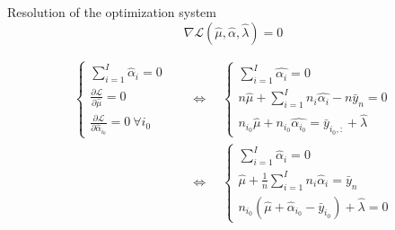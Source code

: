 \documentclass[unknownkeysallowed]{beamer}
\begin{document}
\begin{frame}{Resolution of the optimization system}
\[\nabla \mathcal{L}(\hat\mu,\hat\alpha,\hat\lambda)=0\]

\[
\begin{aligned}
\begin{cases}
\sum\limits_{i=1}^{I}\hat{\alpha}_i=0 \\
\frac{\partial \mathcal{L}}{\partial \hat\mu}=0\\
\frac{\partial \mathcal{L}}{\partial \hat\alpha_{i_0}}=0\ \forall i_0
\end{cases}
\quad&\Longleftrightarrow\quad
\begin{cases}
\sum\limits_{i=1}^{I}\hat{\alpha_i}=0 \\
n\hat{\mu}+ \sum\limits_{i=1}^I n_i\hat{\alpha_i}-n\bar{y}_n=0\\
n_{i_0} \hat{\mu} +n_{i_0} \hat{\alpha_{i_0}} = \bar{y}_{i_0,:} + \hat\lambda
\end{cases} \\
& \Longleftrightarrow\quad
\begin{cases}
\displaystyle\sum_{i=1}^{I}\hat{\alpha}_i=0  \\
\hat{\mu}+\frac{1}{n} \sum\limits_{i=1}^I n_i \hat{\alpha}_i=\bar{y}_n \\
n_{i_0}(\hat{\mu}+\hat{\alpha}_{i_0}-\bar{y}_{i_0}) +\hat{\lambda}=0 
\end{cases}
\end{aligned}
\]

\end{frame}

\end{document}
